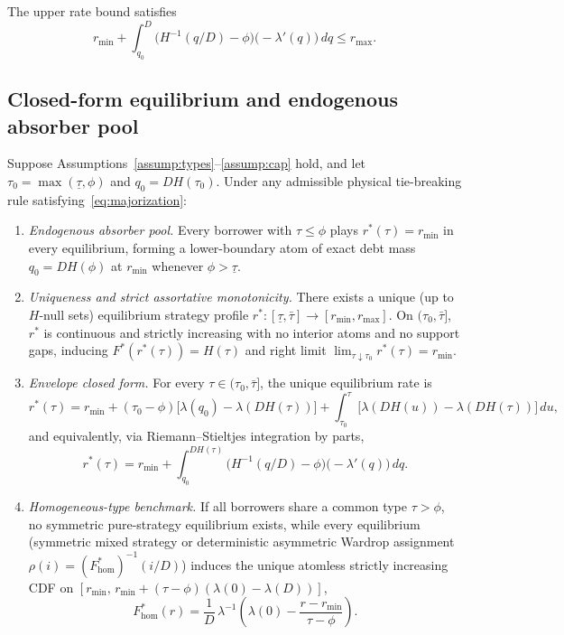 \begin{assumption}\label{assump:cap}
The upper rate bound satisfies
\[
r_{\min} + \int_{q_0}^{D} \bigl(H^{-1}(q/D) - \phi\bigr)\bigl(-\lambda'(q)\bigr)\,dq \le r_{\max}.
\]
\end{assumption}

\subsection{Closed-form equilibrium and endogenous absorber pool}\label{subsec:eq_theorem}

\begin{theorem}\label{thm:eq}
Suppose Assumptions~\ref{assump:types}--\ref{assump:cap} hold, and let $\tau_0 = \max(\underline{\tau}, \phi)$ and $q_0 = D H(\tau_0)$. Under any admissible physical tie-breaking rule satisfying~\eqref{eq:majorization}:
\begin{enumerate}[label=(\roman*), leftmargin=2.2em, itemsep=2pt]
\item \emph{Endogenous absorber pool.} Every borrower with $\tau \le \phi$ plays $r^*(\tau) = r_{\min}$ in every equilibrium, forming a lower-boundary atom of exact debt mass $q_0 = D H(\phi)$ at $r_{\min}$ whenever $\phi > \underline{\tau}$.
\item \emph{Uniqueness and strict assortative monotonicity.} There exists a unique (up to $H$-null sets) equilibrium strategy profile $r^* : [\underline{\tau}, \bar{\tau}] \to [r_{\min}, r_{\max}]$. On $(\tau_0, \bar{\tau}]$, $r^*$ is continuous and strictly increasing with no interior atoms and no support gaps, inducing $F^*(r^*(\tau)) = H(\tau)$ and right limit $\lim_{\tau \downarrow \tau_0} r^*(\tau) = r_{\min}$.
\item \emph{Envelope closed form.} For every $\tau \in (\tau_0, \bar{\tau}]$, the unique equilibrium rate is
\begin{equation}\label{eq:r_envelope}
r^*(\tau) = r_{\min} + (\tau_0 - \phi)\bigl[\lambda(q_0) - \lambda(D H(\tau))\bigr] + \int_{\tau_0}^{\tau} \bigl[\lambda(D H(u)) - \lambda(D H(\tau))\bigr]\,du,
\end{equation}
and equivalently, via Riemann--Stieltjes integration by parts,
\begin{equation}\label{eq:r_stieltjes}
r^*(\tau) = r_{\min} + \int_{q_0}^{D H(\tau)} \bigl(H^{-1}(q/D) - \phi\bigr)\bigl(-\lambda'(q)\bigr)\,dq.
\end{equation}
\item \emph{Homogeneous-type benchmark.} If all borrowers share a common type $\tau > \phi$, no symmetric pure-strategy equilibrium exists, while every equilibrium (symmetric mixed strategy or deterministic asymmetric Wardrop assignment $\rho(i) = (F_{\mathrm{hom}}^*)^{-1}(i/D)$) induces the unique atomless strictly increasing CDF on $[r_{\min},\, r_{\min} + (\tau - \phi)(\lambda(0) - \lambda(D))]$,
\begin{equation}\label{eq:r_hom}
F_{\mathrm{hom}}^*(r) = \frac{1}{D}\,\lambda^{-1}\!\left(\lambda(0) - \frac{r - r_{\min}}{\tau - \phi}\right).
\end{equation}
\end{enumerate}
\end{theorem}


